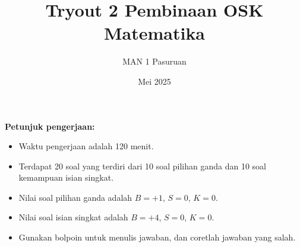 \documentclass[11pt,a4paper,DIV=12]{scrartcl}
\theoremstyle{problemstyle}
\theoremstyle{answerstyle}
\begin{document}
\title{Tryout 2 Pembinaan OSK Matematika}
\author{MAN 1 Pasuruan}
\date{Mei 2025}
\maketitle
\noindent\textbf{Petunjuk pengerjaan:}
\begin{itemize}
  \item Waktu pengerjaan adalah 120 menit.
  \item Terdapat 20 soal yang terdiri dari 10 soal pilihan ganda dan 10 soal kemampuan isian singkat.
  \item Nilai soal pilihan ganda adalah {\color{green!70!black}$B=+1$}, {\color{red}$S=0$}, $K=0$.
  \item Nilai soal isian singkat adalah {\color{green!70!black}$B=+4$}, {\color{red}$S=0$}, $K=0$.
  \item Gunakan bolpoin untuk menulis jawaban, dan coretlah jawaban yang salah.
\end{itemize}
\end{document}
